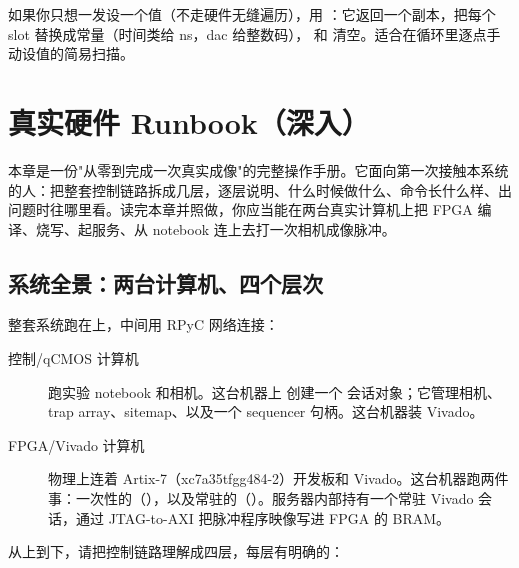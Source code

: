 \documentclass[11pt,oneside,openany]{book}
\begin{document}
\begin{notebox}
如果你只想一发设一个值（不走硬件无缝遍历），用 ：它返回一个副本，把每个 slot 替换成常量（时间类给 ns，dac 给整数码）， 和  清空。适合在循环里逐点手动设值的简易扫描。
\end{notebox}

\chapter{真实硬件 Runbook（深入）}

本章是一份"从零到完成一次真实成像"的完整操作手册。它面向第一次接触本系统的人：把整套控制链路拆成几层，逐层说明、什么时候做什么、命令长什么样、出问题时往哪里看。读完本章并照做，你应当能在两台真实计算机上把 FPGA 编译、烧写、起服务、从 notebook 连上去打一次相机成像脉冲。

\section{系统全景：两台计算机、四个层次}

整套系统跑在上，中间用 RPyC 网络连接：

\begin{description}
\item[控制/qCMOS 计算机] 跑实验 notebook 和相机。这台机器上  创建一个  会话对象；它管理相机、trap array、sitemap、以及一个 sequencer 句柄。这台机器装 Vivado。
\item[FPGA/Vivado 计算机] 物理上连着 Artix-7（xc7a35tfgg484-2）开发板和 Vivado。这台机器跑两件事：一次性的（），以及常驻的（）。服务器内部持有一个常驻 Vivado  会话，通过 JTAG-to-AXI 把脉冲程序映像写进 FPGA 的 BRAM。
\end{description}

从上到下，请把控制链路理解成四层，每层有明确的：
\end{document}
